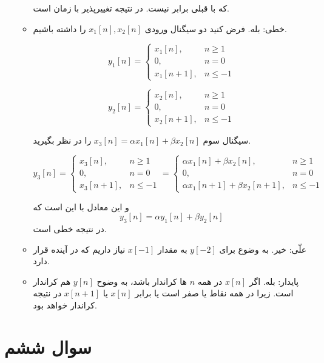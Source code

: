 \documentclass[12pt]{article}
\begin{document}
\begin{enumerate}[label = \harfi*)]
\begin{itemize}
که با قبلی برابر نیست. در نتیجه تغییرپذیر با زمان است.
	
	 
	\item
	خطی: بله. فرض کنید دو سیگنال ورودی
	$x_1[n] , x_2[n]$
	را داشته باشیم.
	
	$$
	y_1[n]=\left\{\begin{array}{lc}
		x_1[n], & n \geq 1 \\
		0, & n=0 \\
		x_1[n+1], & n \leq-1
	\end{array}\right.
	$$
	
		
	$$
	y_2[n]=\left\{\begin{array}{lc}
		x_2[n], & n \geq 1 \\
		0, & n=0 \\
		x_2[n+1], & n \leq-1
	\end{array}\right.
	$$
	
	سیگنال سوم
	$x_3[n] = \alpha x_1[n] + \beta x_2[n]$
	را در نظر بگیرید.
	
	
		$$
	y_3[n]=\left\{\begin{array}{lc}
		x_3[n], & n \geq 1 \\
		0, & n=0 \\
		x_3[n+1], & n \leq-1
	\end{array}\right. = 
\left\{\begin{array}{lc}
 \alpha x_1[n] + \beta x_2[n], & n \geq 1 \\
	0, & n=0 \\
	 \alpha x_1[n+1] + \beta x_2[n+1], & n \leq-1
\end{array}\right.
	$$
	
	و این معادل با این است که
	$$y_3[n] = \alpha y_1[n] + \beta y_2[n]$$
	در نتیجه خطی است.
	
	\item
	علّی: خیر. به وضوع برای $y[-2]$ به مقدار $x[-1]$ نیاز داریم که در آینده قرار دارد.
	\item
	پایدار: بله. اگر
	 $x[n]$
	 در همه $n$ ها کراندار باشد، به وضوح
	 $y[n]$
	 هم کراندار است. زیرا در همه نقاط یا صفر است یا برابر
	 $x[n]$
	 یا
	 $x[n+1]$
	 در نتیجه کراندار خواهد بود.
	 
\end{itemize}

	
\end{enumerate}

\newpage

\section{سوال ششم}
\end{document}
